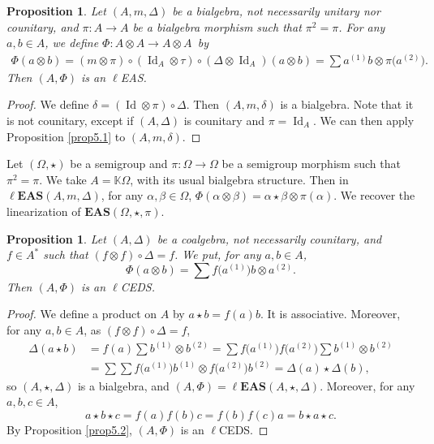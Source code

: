 \documentclass[10pt,a4paper]{amsart}
\numberwithin{equation}{section}
\newtheorem{Proposition}[Theorem]{Proposition}
 { \theoremstyle{definition}
\newtheorem{Definition}[Theorem]{Definition}
\newtheorem{Note}[Theorem]{Note}
\newtheorem{Example}[Theorem]{Example}
\newtheorem{Remark}[Theorem]{Remark}
\newtheorem{Notation}[Theorem]{Notation}}
\newcommand{\eas}{\mathbf{EAS}}
\newcommand{\leas}{\ell\mathbf{EAS}}
\begin{document}
\begin{Proposition}
Let $(A,m,\Delta)$ be a bialgebra, not necessarily unitary nor counitary, and $\pi\colon A\longrightarrow A$ be a bialgebra morphism such that $\pi^2=\pi$. For any $a,b\in A$, we define $\Phi\colon A\otimes A\longrightarrow A\otimes A$~by
\begin{align*}
\Phi(a\otimes b)=(m\otimes \pi)\circ (\operatorname{Id}_A\otimes \tau)\circ (\Delta\otimes \operatorname{Id}_A)(a\otimes b)=\sum a^{(1)}b\otimes \pi\bigl(a^{(2)}\bigr).
\end{align*}
 Then $(A,\Phi)$ is an $\ell$EAS.
\end{Proposition}

\begin{proof}
We define $\delta=(\operatorname{Id} \otimes \pi)\circ \Delta$. Then $(A,m,\delta)$ is a bialgebra. Note that it is not counitary, except if $(A,\Delta)$ is counitary and $\pi=\operatorname{Id}_A$. We can then apply Proposition \ref{prop5.1} to $(A,m,\delta)$.
\end{proof}

\begin{Example}
Let $(\Omega,\star)$ be a semigroup and $\pi\colon\Omega\longrightarrow \Omega$ be a semigroup morphism such that~${\pi^2=\pi}$. We take $A=\mathbb{K}\Omega$, with its usual bialgebra structure. Then in $\leas(A,m,\Delta)$, for any $\alpha,\beta \in \Omega$,
$\Phi(\alpha \otimes \beta)=\alpha\star \beta \otimes \pi(\alpha)$.
We recover the linearization of $\eas(\Omega,\star,\pi)$.
\end{Example}

\begin{Proposition}
Let $(A,\Delta)$ be a coalgebra, not necessarily counitary, and $f\in A^*$ such that $(f\otimes f)\circ \Delta=f$. We put, for any $a,b\in A$,
\[\Phi(a\otimes b)=\sum f\bigl(a^{(1)}\bigr)b\otimes a^{(2)}.\]
Then $(A,\Phi)$ is an $\ell$CEDS.
\end{Proposition}

\begin{proof}
We define a product on $A$ by $a\star b=f(a)b$. It is associative. Moreover, for any $a,b\in A$, as $(f\otimes f)\circ \Delta=f$,
\begin{align*}
\Delta(a\star b)&=f(a)\sum b^{(1)}\otimes b^{(2)}=\sum f\bigl(a^{(1)}\bigr)f\bigl(a^{(2)}\bigr)\sum b^{(1)}\otimes b^{(2)}\\
&=\sum\sum f\bigl(a^{(1)}\bigr)b^{(1)}\otimes f\bigl(a^{(2)}\bigr)b^{(2)}=\Delta(a)\star \Delta(b),
\end{align*}
so $(A,\star,\Delta)$ is a bialgebra, and $(A,\Phi)=\leas(A,\star,\Delta)$. Moreover, for any $a,b,c\in A$,
\[a\star b\star c=f(a)f(b)c=f(b)f(c)a=b\star a\star c.\]
By Proposition \ref{prop5.2}, $(A,\Phi)$ is an $\ell$CEDS. \end{proof}
\end{document}
